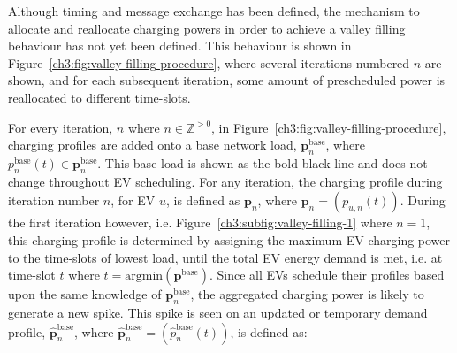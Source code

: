 Although timing and message exchange has been defined, the mechanism to allocate and reallocate charging powers in order to achieve a valley filling behaviour has not yet been defined.
This behaviour is shown in Figure~\ref{ch3:fig:valley-filling-procedure}, where several iterations numbered $n$ are shown, and for each subsequent iteration, some amount of prescheduled power is reallocated to different time-slots.




For every iteration, $n$ where $n \in \mathbb{Z}^{>0}$, in Figure~\ref{ch3:fig:valley-filling-procedure}, charging profiles are added onto a base network load, $\textbf{p}^\text{base}_{n}$, where $p^\text{base}_{n}(t) \in \textbf{p}^\text{base}_{n}$.
This base load is shown as the bold black line and does not change throughout EV scheduling.
For any iteration, the charging profile during iteration number $n$, for EV $u$, is defined as $\textbf{p}_n$, where $\textbf{p}_n = (p_{u,n}(t))$.
During the first iteration however, i.e. Figure~\ref{ch3:subfig:valley-filling-1} where $n=1$, this charging profile is determined by assigning the maximum EV charging power to the time-slots of lowest load, until the total EV energy demand is met, i.e. at time-slot $t$ where $t = \text{argmin}(\textbf{p}^\text{base})$.
Since all EVs schedule their profiles based upon the same knowledge of $\textbf{p}^\text{base}_{n}$, the aggregated charging power is likely to generate a new spike.
This spike is seen on an updated or temporary demand profile, $\hat{\textbf{p}}^\text{base}_{n}$, where $\hat{\textbf{p}}^\text{base}_{n} = (\hat{p}^\text{base}_{n}(t))$, is defined as:




